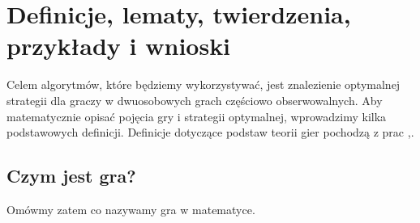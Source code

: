 \documentclass[inzynierska]{pwr_wmat_praca_dyplomowa}
\theoremstyle{plain}
\numberwithin{theorem}{chapter}
\theoremstyle{definition}
\numberwithin{theorem}{chapter}
\begin{document}
%
%
%
%
%
%                     


\chapter{Definicje, lematy, twierdzenia, przykłady i wnioski}
Celem algorytmów, które będziemy wykorzystywać, jest znalezienie optymalnej strategii dla graczy w dwuosobowych grach częściowo obserwowalnych. Aby matematycznie opisać pojęcia gry i strategii optymalnej, wprowadzimy kilka podstawowych definicji.
Definicje dotyczące podstaw teorii gier pochodzą z prac \cite{platkowski2012wstkep},\cite{prisner2014game}.

\section{Czym jest gra?}
Omówmy zatem co nazywamy gra w matematyce.
\end{document}
